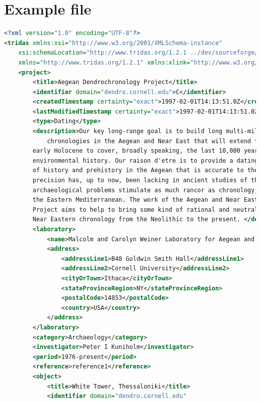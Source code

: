 \section{Example file}
\begin{lstlisting}[language=XML]
<?xml version="1.0" encoding="UTF-8"?>
<tridas xmlns:xsi="http://www.w3.org/2001/XMLSchema-instance"
    xsi:schemaLocation="http://www.tridas.org/1.2.1 ../dev/sourceforge/tridas/XMLSchema/1.2.1/tridas-1.2.1.xsd"
    xmlns="http://www.tridas.org/1.2.1" xmlns:xlink="http://www.w3.org/1999/xlink">
    <project>
        <title>Aegean Dendrochronology Project</title>
        <identifier domain="dendro.cornell.edu">C</identifier>
        <createdTimestamp certainty="exact">1997-02-01T14:13:51.0Z</createdTimestamp>
        <lastModifiedTimestamp certainty="exact">1997-02-01T14:13:51.0Z</lastModifiedTimestamp>
        <type>Dating</type>
        <description>Our key long-range goal is to build long multi-millennial scale tree-ring
            chronologies in the Aegean and Near East that will extend from the present to the 
	    early Holocene to cover, broadly speaking, the last 10,000 years of human and 
	    environmental history. Our raison d'etre is to provide a dating method for the study
	    of history and prehistory in the Aegean that is accurate to the year. This kind of 
	    precision has, up to now, been lacking in ancient studies of this area. Indeed, few 
	    archaeological problems stimulate as much rancor as chronology, especially that of 
	    the Eastern Mediterranean. The work of the Aegean and Near Eastern Dendrochronology 
	    Project aims to help to bring some kind of rational and neutral order to Aegean and 
	    Near Eastern chronology from the Neolithic to the present. </description>
        <laboratory>
            <name>Malcolm and Carolyn Weiner Laboratory for Aegean and Near Eastern Dendrochronology</name>
            <address>
                <addressLine1>B48 Goldwin Smith Hall</addressLine1>
                <addressLine2>Cornell University</addressLine2>
                <cityOrTown>Ithaca</cityOrTown>
                <stateProvinceRegion>NY</stateProvinceRegion>
                <postalCode>14853</postalCode>
                <country>USA</country>
            </address>
        </laboratory>
        <category>Archaeology</category>
        <investigator>Peter I Kuniholm</investigator>
        <period>1976-present</period>
        <reference>reference1</reference>
        <object>
            <title>White Tower, Thessaloniki</title>
            <identifier domain="dendro.cornell.edu"

\end{lstlisting}
